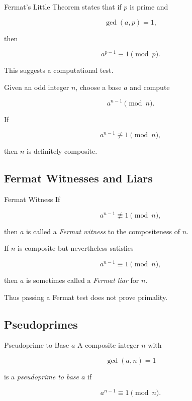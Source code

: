 Fermat's Little Theorem states that if \(p\) is prime and

\[ \gcd(a,p)=1, \]

then

\[ a^{p-1}\equiv1\pmod p. \]

This suggests a computational test.

Given an odd integer \(n\), choose a base \(a\) and compute

\[ a^{n-1}\pmod n. \]

If

\[ a^{n-1}\not\equiv1\pmod n, \]

then \(n\) is definitely composite.

\subsection{Fermat Witnesses and Liars}
\label{subsec:fermat-witnesses}

\begin{definitionbox}{Fermat Witness}
If

\[ a^{n-1}\not\equiv1\pmod n, \]

then \(a\) is called a \emph{Fermat witness} to the compositeness of \(n\).
\end{definitionbox}

If \(n\) is composite but nevertheless satisfies

\[ a^{n-1}\equiv1\pmod n, \]

then \(a\) is sometimes called a \emph{Fermat liar} for \(n\).

Thus passing a Fermat test does not prove primality.

\subsection{Pseudoprimes}
\label{subsec:pseudoprimes}

\begin{definitionbox}{Pseudoprime to Base \(a\)}
A composite integer \(n\) with

\[ \gcd(a,n)=1 \]

is a \emph{pseudoprime to base \(a\)} if

\[ a^{n-1}\equiv1\pmod n. \]
\end{definitionbox}

